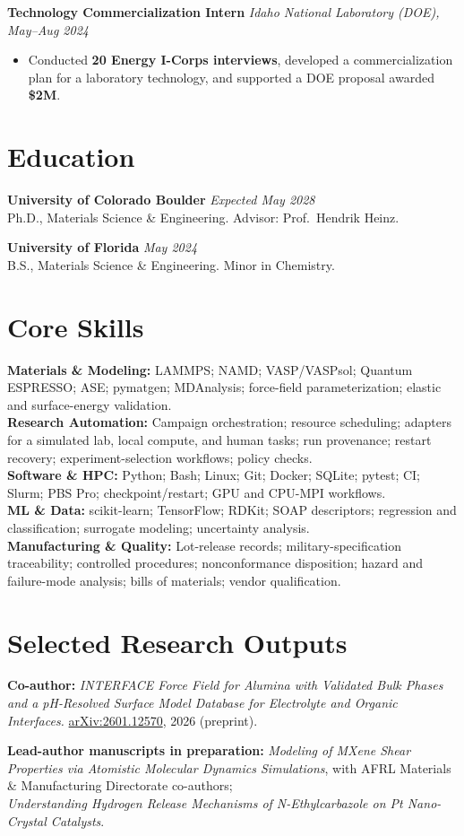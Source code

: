 \documentclass[letterpaper,10pt]{article}
\newcommand{\keep}{\needspace{4\baselineskip}}
\newcommand{\keepsection}{\needspace{6\baselineskip}}
\begin{document}
\keep\textbf{Technology Commercialization Intern} \hfill \textit{Idaho National Laboratory (DOE), May--Aug 2024}
\begin{itemize}
    \item Conducted \textbf{20 Energy I-Corps interviews}, developed a commercialization plan for a laboratory technology, and supported a DOE proposal awarded \textbf{\$2M}.
\end{itemize}

\keepsection\section*{Education}
\textbf{University of Colorado Boulder} \hfill \textit{Expected May 2028}\\
Ph.D., Materials Science \& Engineering. Advisor: Prof.\ Hendrik Heinz.

\textbf{University of Florida} \hfill \textit{May 2024}\\
B.S., Materials Science \& Engineering. Minor in Chemistry.

\keepsection\section*{Core Skills}
\textbf{Materials \& Modeling:} LAMMPS; NAMD; VASP/VASPsol; Quantum ESPRESSO; ASE; pymatgen; MDAnalysis; force-field parameterization; elastic and surface-energy validation.\\
\textbf{Research Automation:} Campaign orchestration; resource scheduling; adapters for a simulated lab, local compute, and human tasks; run provenance; restart recovery; experiment-selection workflows; policy checks.\\
\textbf{Software \& HPC:} Python; Bash; Linux; Git; Docker; SQLite; pytest; CI; Slurm; PBS Pro; checkpoint/restart; GPU and CPU-MPI workflows.\\
\textbf{ML \& Data:} scikit-learn; TensorFlow; RDKit; SOAP descriptors; regression and classification; surrogate modeling; uncertainty analysis.\\
\textbf{Manufacturing \& Quality:} Lot-release records; military-specification traceability; controlled procedures; nonconformance disposition; hazard and failure-mode analysis; bills of materials; vendor qualification.

\keepsection\section*{Selected Research Outputs}
\textbf{Co-author:} \textit{INTERFACE Force Field for Alumina with Validated Bulk Phases and a pH-Resolved Surface Model Database for Electrolyte and Organic Interfaces.} \href{https://arxiv.org/abs/2601.12570}{arXiv:2601.12570}, 2026 (preprint).

\textbf{Lead-author manuscripts in preparation:} \textit{Modeling of MXene Shear Properties via Atomistic Molecular Dynamics Simulations}, with AFRL Materials \& Manufacturing Directorate co-authors;\\ \textit{Understanding Hydrogen Release Mechanisms of N-Ethylcarbazole on Pt Nano-Crystal Catalysts}.
\end{document}
